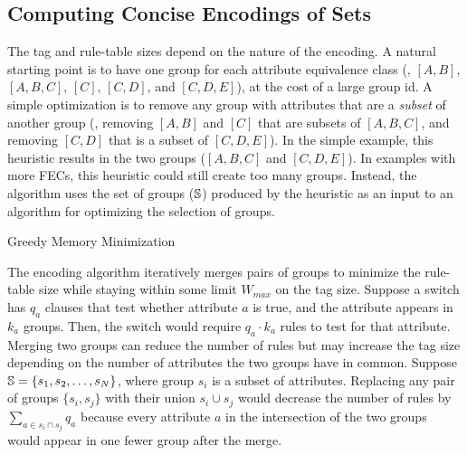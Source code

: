 \subsection{Computing Concise Encodings of Sets}
\label{ssec:merge}
The tag and rule-table sizes depend on the nature of the encoding.  A
natural starting point is to have one group for each attribute
equivalence class (\eg, $[A,B]$, $[A,B,C]$, $[C]$, $[C,D]$, and
$[C,D,E]$), at the cost of a large group id.  A simple optimization is
to remove any group with attributes that are a \emph{subset} of
another group (\eg, removing $[A,B]$ and $[C]$ that are subsets of
$[A,B,C]$, and removing $[C,D]$ that is a subset of $[C,D,E]$).  In
the simple example, this heuristic results in the two groups
($[A,B,C]$ and $[C,D,E]$).  In examples with more FECs, this
heuristic could still create too many groups. Instead, the algorithm uses the
set of groups ($\mathbb{S}$) produced by the heuristic as an input to an
algorithm for optimizing the selection of groups.

\begin{algorithm}
\DontPrintSemicolon
{}
\caption{Greedy Memory Minimization\label{alg:memory_min}}
\end{algorithm}

The encoding algorithm iteratively merges pairs of groups to minimize the
rule-table size while staying within some limit $W_{max}$ on the tag
size.  Suppose a switch has $q_a$ clauses that test whether attribute
$a$ is true, and the attribute appears in $k_a$ groups.  Then, the
switch would require $q_a \cdot k_a$ rules to test for that attribute.
Merging two groups can reduce the number of rules but may
increase the tag size depending on the number of attributes the two
groups have in common.  Suppose $\mathbb{S} = \{s_1, s_2, \dots, s_N\}$,
where group $s_i$ is a subset of attributes.  Replacing any pair of
groups $\{s_i, s_j\}$ with their union $s_i\cup s_j$ would decrease
the number of rules by $\sum_{a \in s_i\cap s_j}q_a$ because every
attribute $a$ in the intersection of the two groups would appear in
one fewer group after the merge.

